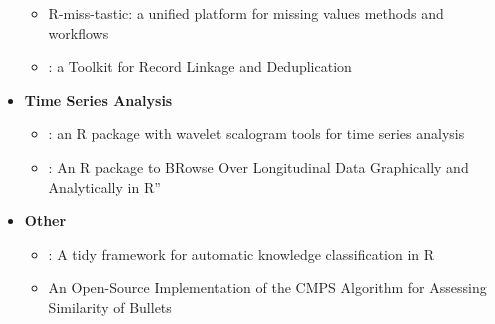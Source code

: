\begin{itemize}
  \begin{itemize}
  \tightlist
  \item
    R-miss-tastic: a unified platform for missing values methods and workflows
  \item
    : a Toolkit for Record Linkage and Deduplication
  \end{itemize}
\item
  \textbf{Time Series Analysis}

  \begin{itemize}
  \tightlist
  \item
    : an R package with wavelet scalogram tools for time series analysis
  \item
    : An R package to BRowse Over Longitudinal Data Graphically and Analytically in R''
  \end{itemize}
\item
  \textbf{Other}

  \begin{itemize}
  \tightlist
  \item
    : A tidy framework for automatic knowledge classification in R
  \item
    An Open-Source Implementation of the CMPS Algorithm for Assessing Similarity of Bullets
  \end{itemize}
\end{itemize}


\address{%
Catherine Hurley\\
Maynooth University\\%
\\
%
\url{https://journal.r-project.org}\\%
%
\href{mailto:r-journal@r-project.org}{\nolinkurl{r-journal@r-project.org}}%
}
